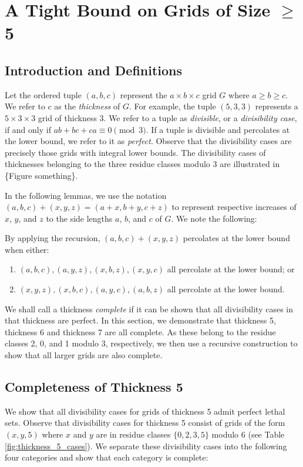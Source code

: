 \chapter{A Tight Bound on Grids of Size $\geq$ 5}

\section{Introduction and Definitions}
Let the ordered tuple $(a,b,c)$ represent the $a \times b \times c$ grid $G$ where $a \geq b \geq c$. We refer to $c$ as the \emph{thickness} of $G$. For example, the tuple $(5,3,3)$ represents a $5 \times 3 \times 3$ grid of thickness 3. We refer to a tuple as \emph{divisible}, or a \emph{divisibility case}, if and only if $ab+bc+ca \equiv 0 \pmod 3$. If a tuple is divisible and percolates at the lower bound, we refer to it as \emph{perfect}. Observe that the divisibility cases are precisely those grids with integral lower bounds. The divisibility cases of thicknesses belonging to the three residue classes modulo 3 are illustrated in \{Figure something\}.

In the following lemmas, we use the notation $(a,b,c)+(x,y,z) = (a+x, b+y, c+z)$ to represent respective increases of $x$, $y$, and $z$ to the side lengths $a$, $b$, and $c$ of $G$. We note the following: 
\begin{rem}
\label{rem:recursion_pieces}
By applying the recursion, $(a,b,c)+(x,y,z)$ percolates at the lower bound when either:
\begin{enumerate}
\item $(a,b,c), (a,y,z), (x,b,z), (x,y,c)$ all percolate at the lower bound; or
\item $(x,y,z), (x,b,c), (a,y,c), (a,b,z)$ all percolate at the lower bound.
\end{enumerate}
\end{rem}

We shall call a thickness \emph{complete} if it can be shown that all divisibility cases in that thickness are perfect. In this section, we demonstrate that thickness 5, thickness 6 and thickness 7 are all complete. As these belong to the residue classes 2, 0, and 1 modulo 3, respectively, we then use a recursive construction to show that all larger grids are also complete. 

\section{Completeness of Thickness 5}
We show that all divisibility cases for grids of thickness 5 admit perfect lethal sets. Observe that divisibility cases for thickness 5 consist of grids of the form $(x,y,5)$ where $x$ and $y$ are in residue classes $\{0,2,3,5\}$ modulo 6 (see Table \ref{fig:thickness_5_cases}). We separate these divisibility cases into the following four categories and show that each category is complete:

